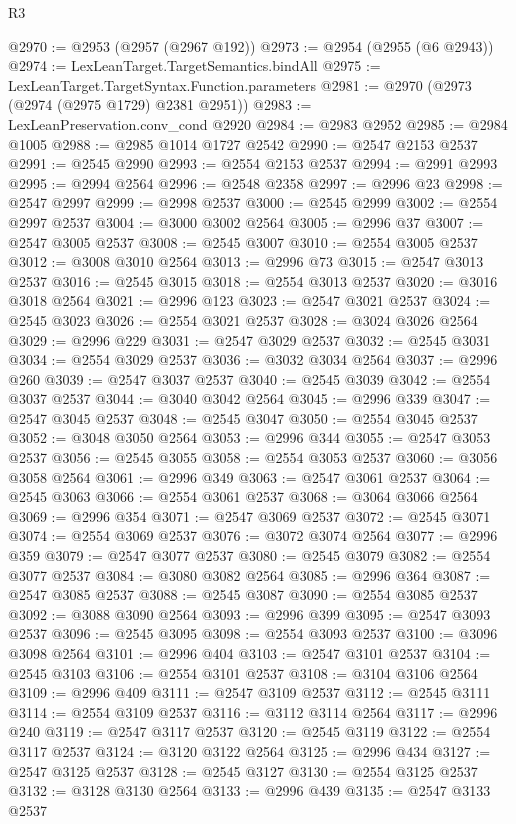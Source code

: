 \begin{lexlean}{R3}
\begin{coremodule}
@2970 := @2953 (@2957 (@2967 @192))
@2973 := @2954 (@2955 (@6 @2943))
@2974 := LexLeanTarget.TargetSemantics.bindAll
@2975 := LexLeanTarget.TargetSyntax.Function.parameters
@2981 := @2970 (@2973 (@2974 (@2975 @1729) @2381 @2951))
@2983 := LexLeanPreservation.conv_cond @2920
@2984 := @2983 @2952
@2985 := @2984 @1005
@2988 := @2985 @1014 @1727 @2542
@2990 := @2547 @2153 @2537
@2991 := @2545 @2990
@2993 := @2554 @2153 @2537
@2994 := @2991 @2993
@2995 := @2994 @2564
@2996 := @2548 @2358
@2997 := @2996 @23
@2998 := @2547 @2997
@2999 := @2998 @2537
@3000 := @2545 @2999
@3002 := @2554 @2997 @2537
@3004 := @3000 @3002 @2564
@3005 := @2996 @37
@3007 := @2547 @3005 @2537
@3008 := @2545 @3007
@3010 := @2554 @3005 @2537
@3012 := @3008 @3010 @2564
@3013 := @2996 @73
@3015 := @2547 @3013 @2537
@3016 := @2545 @3015
@3018 := @2554 @3013 @2537
@3020 := @3016 @3018 @2564
@3021 := @2996 @123
@3023 := @2547 @3021 @2537
@3024 := @2545 @3023
@3026 := @2554 @3021 @2537
@3028 := @3024 @3026 @2564
@3029 := @2996 @229
@3031 := @2547 @3029 @2537
@3032 := @2545 @3031
@3034 := @2554 @3029 @2537
@3036 := @3032 @3034 @2564
@3037 := @2996 @260
@3039 := @2547 @3037 @2537
@3040 := @2545 @3039
@3042 := @2554 @3037 @2537
@3044 := @3040 @3042 @2564
@3045 := @2996 @339
@3047 := @2547 @3045 @2537
@3048 := @2545 @3047
@3050 := @2554 @3045 @2537
@3052 := @3048 @3050 @2564
@3053 := @2996 @344
@3055 := @2547 @3053 @2537
@3056 := @2545 @3055
@3058 := @2554 @3053 @2537
@3060 := @3056 @3058 @2564
@3061 := @2996 @349
@3063 := @2547 @3061 @2537
@3064 := @2545 @3063
@3066 := @2554 @3061 @2537
@3068 := @3064 @3066 @2564
@3069 := @2996 @354
@3071 := @2547 @3069 @2537
@3072 := @2545 @3071
@3074 := @2554 @3069 @2537
@3076 := @3072 @3074 @2564
@3077 := @2996 @359
@3079 := @2547 @3077 @2537
@3080 := @2545 @3079
@3082 := @2554 @3077 @2537
@3084 := @3080 @3082 @2564
@3085 := @2996 @364
@3087 := @2547 @3085 @2537
@3088 := @2545 @3087
@3090 := @2554 @3085 @2537
@3092 := @3088 @3090 @2564
@3093 := @2996 @399
@3095 := @2547 @3093 @2537
@3096 := @2545 @3095
@3098 := @2554 @3093 @2537
@3100 := @3096 @3098 @2564
@3101 := @2996 @404
@3103 := @2547 @3101 @2537
@3104 := @2545 @3103
@3106 := @2554 @3101 @2537
@3108 := @3104 @3106 @2564
@3109 := @2996 @409
@3111 := @2547 @3109 @2537
@3112 := @2545 @3111
@3114 := @2554 @3109 @2537
@3116 := @3112 @3114 @2564
@3117 := @2996 @240
@3119 := @2547 @3117 @2537
@3120 := @2545 @3119
@3122 := @2554 @3117 @2537
@3124 := @3120 @3122 @2564
@3125 := @2996 @434
@3127 := @2547 @3125 @2537
@3128 := @2545 @3127
@3130 := @2554 @3125 @2537
@3132 := @3128 @3130 @2564
@3133 := @2996 @439
@3135 := @2547 @3133 @2537

\end{coremodule}
\end{lexlean}
